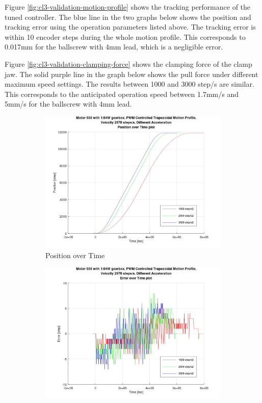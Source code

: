 Figure \ref{fig:cl3-validation-motion-profile} shows the tracking performance of the tuned controller. The blue line in the two graphs below shows the position and tracking error using the operation parameters listed above. The tracking error is within 10 encoder steps during the whole motion profile. This corresponds to 0.017mm for the ballscrew with 4mm lead, which is a negligible error.

Figure \ref{fig:cl3-validation-clamping-force} shows the clamping force of the clamp jaw. The solid purple line in the graph below shows the pull force under different maximum speed settings. The results between 1000 and 3000 step/s are similar. This corresponds to the anticipated operation speed between 1.7mm/s and 5mm/s for the ballscrew with 4mm lead.

\begin{figure}[!htp]
    \centering
    \begin{subfigure}[b]{0.49\textwidth}
        \centering
        \includegraphics[width=\textwidth]{images/05/image85.jpg}
        \caption{Position over Time}
        \label{fig:cl3-validation-position}
    \end{subfigure}
    \hfill
    \begin{subfigure}[b]{0.49\textwidth}
        \centering
        \includegraphics[width=\textwidth]{images/05/image22.jpg}

\end{subfigure}
\end{figure}
